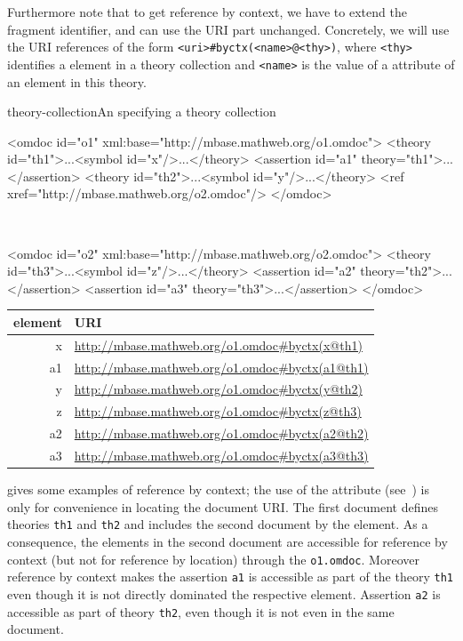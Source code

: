 Furthermore note that to get reference by context, we have to extend the fragment
identifier, and can use the URI part unchanged. Concretely, we will use the URI
references of the form {\tt{<uri>\#byctx(<name>@<thy>)}}, where {\tt{<thy>}}
identifies a {} element in a theory collection and {\tt{<name>}}
is the value of a {} attribute of an {\omdoc} element in this
theory.

\begin{myfig}{theory-collection}{An {\omdoc} specifying a theory collection}
\footnotesize
\begin{boxedverbatim}
<omdoc id="o1" xml:base="http://mbase.mathweb.org/o1.omdoc">
 <theory id="th1">...<symbol id="x"/>...</theory>
 <assertion id="a1" theory="th1">...</assertion>
 <theory id="th2">...<symbol id="y"/>...</theory>
 <ref xref="http://mbase.mathweb.org/o2.omdoc"/>
</omdoc>
\end{boxedverbatim}
\\
\begin{boxedverbatim}
<omdoc id="o2" xml:base="http://mbase.mathweb.org/o2.omdoc">
 <theory id="th3">...<symbol id="z"/>...</theory>
 <assertion id="a2" theory="th2">...</assertion>
 <assertion id="a3" theory="th3">...</assertion>
</omdoc>
\end{boxedverbatim}
 
\begin{tabular}{|r|l|}\hline
  element & URI\\\hline
  x & {\url{http://mbase.mathweb.org/o1.omdoc#byctx(x@th1)}}\\
  a1 & {\url{http://mbase.mathweb.org/o1.omdoc#byctx(a1@th1)}}\\
  y & {\url{http://mbase.mathweb.org/o1.omdoc#byctx(y@th2)}}\\
  z & {\url{http://mbase.mathweb.org/o1.omdoc#byctx(z@th3)}}\\
  a2 & {\url{http://mbase.mathweb.org/o1.omdoc#byctx(a2@th2)}}\\
  a3 & {\url{http://mbase.mathweb.org/o1.omdoc#byctx(a3@th3)}}\\\hline
\end{tabular}
\end{myfig}
{} gives some examples of reference by context; the
use of the {} attribute (see~\cite{Marsh:xmlb01}) is only
for convenience in locating the document URI. The first {\omdoc} document defines
theories {\tt{th1}} and {\tt{th2}} and includes the second document by the
{} element. As a consequence, the elements in the second document are
accessible for reference by context (but not for reference by location) through
the {\tt{o1.omdoc}}. Moreover reference by context makes the assertion {\tt{a1}}
is accessible as part of the theory {\tt{th1}} even though it is not directly
dominated the respective {} element.  Assertion {\tt{a2}} is
accessible as part of theory {\tt{th2}}, even though it is not even in the same
document.

